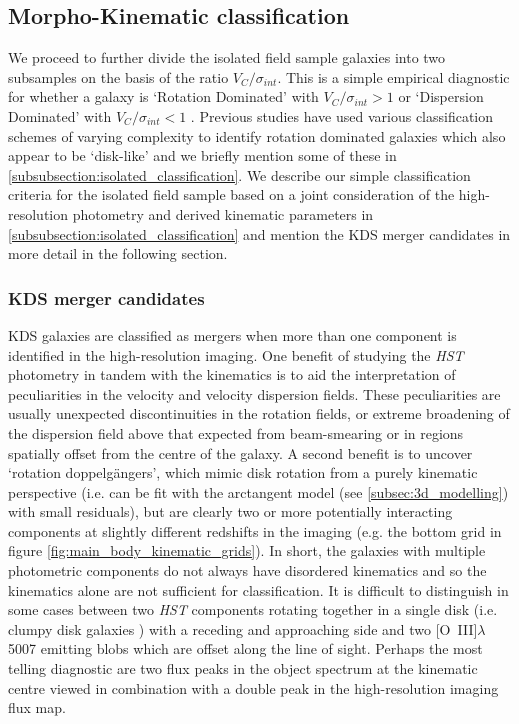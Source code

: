 \documentclass[fleqn,usenatbib]{mn2e}
\begin{document}
\subsection{Morpho-Kinematic classification}\label{subsec:morpho-kin-class}
We proceed to further divide the isolated field sample galaxies into two subsamples on the basis of the ratio $V_{C}/\sigma_{int}$.
This is a simple empirical diagnostic for whether a galaxy is `Rotation Dominated' with $V_{C}/\sigma_{int} > 1$ or `Dispersion Dominated' with $V_{C}/\sigma_{int} < 1$  \citep[i.e. a method to measure the prevalence of rotational and random motions][]{Epinat2012,Wisnioski2015,Stott2016,Harrison2017}.
Previous studies have used various classification schemes of varying complexity to identify rotation dominated galaxies which also appear to be `disk-like' and we briefly mention some of these in \cref{subsubsection:isolated_classification}.
We describe our simple classification criteria for the isolated field sample based on a joint consideration of the high-resolution photometry and derived kinematic parameters in \cref{subsubsection:isolated_classification} and mention the KDS merger candidates in more detail in the following section.

\subsubsection{KDS merger candidates}\label{subsubsection:merger_candidates}
KDS galaxies are classified as mergers when more than one component is identified in the high-resolution imaging.  
One benefit of studying the {\em HST} photometry in tandem with the kinematics is to aid the interpretation of peculiarities in the velocity and velocity dispersion fields.
These peculiarities are usually unexpected discontinuities in the rotation fields, or extreme broadening of the dispersion field above that expected from beam-smearing or in regions spatially offset from the centre of the galaxy.
A second benefit is to uncover `rotation doppelg{\"a}ngers', which mimic disk rotation from a purely kinematic perspective (i.e. can be fit with the arctangent model (see \cref{subsec:3d_modelling}) with small residuals), but are clearly two or more potentially interacting components at slightly different redshifts in the imaging (e.g. the bottom grid in figure \ref{fig:main_body_kinematic_grids}).
In short, the galaxies with multiple photometric components do not always have disordered kinematics and so the kinematics alone are not sufficient for classification.
It is difficult to distinguish in some cases between two {\em HST} components rotating together in a single disk (i.e. clumpy disk galaxies \citep[e.g.][]{Elmegreen2004,Bournaud2007}) with a receding and approaching side and two [O~{\sc III}]$\lambda$5007 emitting blobs which are offset along the line of sight.
Perhaps the most telling diagnostic are two flux peaks in the object spectrum at the kinematic centre viewed in combination with a double peak in the high-resolution imaging flux map. \\
\end{document}
